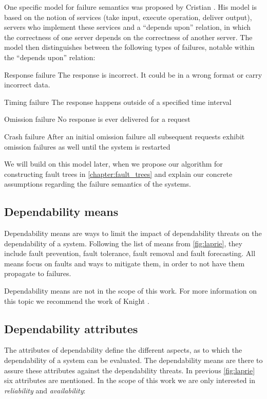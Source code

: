 One specific model for failure semantics was proposed by Cristian \cite{cristian}. His model is based on the notion of services (take input, execute operation, deliver output), servers who implement these services and a ``depends upon'' relation, in which the correctness of one server depends on the correctness of another server. The model then distinguishes between the following types of failures, notable within the ``depends upon'' relation:
\begin{tdescription}
  \item[Response failure] The response is incorrect. It could be in a wrong format or carry incorrect data.
  \item[Timing failure] The response happens outside of a specified time interval
  \item[Omission failure] No response is ever delivered for a request
  \item[Crash failure] After an initial omission failure all subsequent requests exhibit omission failures as well until the system is restarted
\end{tdescription}

We will build on this model later, when we propose our algorithm for constructing fault trees in \autoref{chapter:fault_trees} and explain our concrete assumptions regarding the failure semantics of the systems.

\subsection{Dependability means}
\label{subsec:dep_means}

Dependability means are ways to limit the impact of dependability threats on the dependability of a system. Following the list of means from \autoref{fig:laprie}, they include fault prevention, fault tolerance, fault removal and fault forecasting. All means focus on faults and ways to mitigate them, in order to not have them propagate to failures.

Dependability means are not in the scope of this work. For more information on this topic we recommend the work of Knight \cite{FundamentalsDepComputing}.

\subsection{Dependability attributes}
\label{sec:theory_dep_attrs}

The attributes of dependability define the different aspects, as to which the dependability of a system can be evaluated. The dependability means are there to assure these attributes against the dependability threats. In previous \autoref{fig:laprie} six attributes are mentioned. In the scope of this work we are only interested in \emph{reliability} and \emph{availability}:

